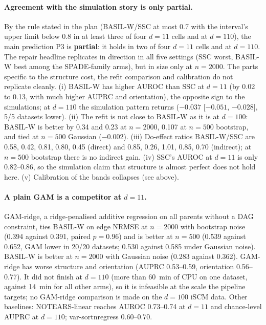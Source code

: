 \paragraph{Agreement with the simulation story is only partial.} By the rule stated in the plan (BASIL-W/SSC at most 0.7 with the interval's upper limit below 0.8 in at least three of four $d=11$ cells and at $d=110$), the main prediction P3 is \textbf{partial}: it holds in two of four $d=11$ cells and at $d=110$. The repair headline replicates in direction in all five settings (SSC worst, BASIL-W best among the SPADE-family arms), but in size only at $n=2000$. The parts specific to the structure cost, the refit comparison and calibration do not replicate cleanly. (i) BASIL-W has higher AUROC than SSC at $d=11$ (by 0.02 to 0.13, with much higher AUPRC and orientation), the opposite sign to the simulations; at $d=110$ the simulation pattern returns ($-0.037$ [$-0.051$, $-0.028]$, 5/5 datasets lower). (ii) The refit is not close to BASIL-W as it is at $d=100$: BASIL-W is better by 0.34 and 0.23 at $n=2000$, 0.107 at $n=500$ bootstrap, and tied at $n=500$ Gaussian ($-0.002$). (iii) Do-effect ratios BASIL-W/SSC are 0.58, 0.42, 0.81, 0.80, 0.45 (direct) and 0.85, 0.26, 1.01, 0.85, 0.70 (indirect); at $n=500$ bootstrap there is no indirect gain. (iv) SSC's AUROC at $d=11$ is only 0.82--0.86, so the simulation claim that structure is almost perfect does not hold here. (v) Calibration of the bands collapses (see above).

\paragraph{A plain GAM is a competitor at $d=11$.} GAM-ridge, a ridge-penalised additive regression on all parents without a DAG constraint, ties BASIL-W on edge NRMSE at $n=2000$ with bootstrap noise (0.394 against 0.391, paired $p=0.96$) and is better at $n=500$ (0.539 against 0.652, GAM lower in 20/20 datasets; 0.530 against 0.585 under Gaussian noise). BASIL-W is better at $n=2000$ with Gaussian noise (0.283 against 0.362). GAM-ridge has worse structure and orientation (AUPRC 0.53--0.59, orientation 0.56--0.77). It did not finish at $d=110$ (more than 60~min of CPU on one dataset, against 14~min for all other arms), so it is infeasible at the scale the pipeline targets; no GAM-ridge comparison is made on the $d=100$ iSCM data. Other baselines: NOTEARS-linear reaches AUROC 0.73--0.74 at $d=11$ and chance-level AUPRC at $d=110$; var-sortnregress 0.60--0.70.

